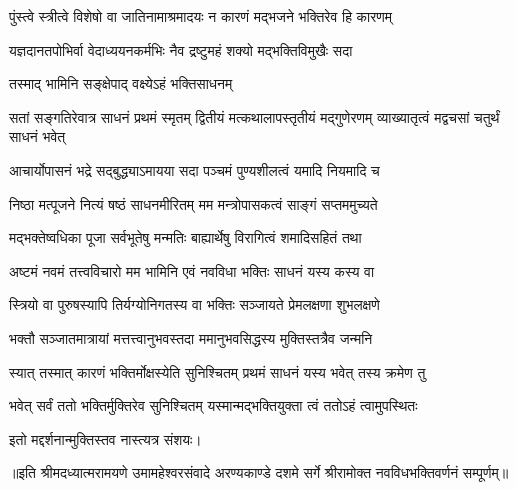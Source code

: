 


\addtocounter{shlokacount}{19}


\twolineshloka
{पुंस्त्वे स्त्रीत्वे विशेषो वा जातिनामाश्रमादयः}
{न कारणं मद्भजने भक्तिरेव हि कारणम्} %

\twolineshloka
{यज्ञदानतपोभिर्वा वेदाध्ययनकर्मभिः}
{नैव द्रष्टुमहं शक्यो मद्भक्तिविमुखैः सदा} %

\onelineshloka
{तस्माद् भामिनि सङ्क्षेपाद् वक्ष्येऽहं भक्तिसाधनम्} %


\threelineshloka
{सतां सङ्गतिरेवात्र साधनं प्रथमं स्मृतम्}
{द्वितीयं मत्कथालापस्तृतीयं मद्गुणेरणम्}
{व्याख्यातृत्वं मद्वचसां चतुर्थं साधनं भवेत्} %

\twolineshloka
{आचार्योपासनं भद्रे सद्बुद्ध्याऽमायया सदा}
{पञ्चमं पुण्यशीलत्वं यमादि नियमादि च} %

\twolineshloka
{निष्ठा मत्पूजने नित्यं षष्ठं साधनमीरितम्}
{मम मन्त्रोपासकत्वं साङ्गं सप्तममुच्यते} %

\twolineshloka
{मद्भक्तेष्वधिका पूजा सर्वभूतेषु मन्मतिः}
{बाह्यार्थेषु विरागित्वं शमादिसहितं तथा} %

\twolineshloka
{अष्टमं नवमं तत्त्वविचारो मम भामिनि}
{एवं नवविधा भक्तिः साधनं यस्य कस्य वा} %

\twolineshloka
{स्त्रियो वा पुरुषस्यापि तिर्यग्योनिगतस्य वा}
{भक्तिः सञ्जायते प्रेमलक्षणा शुभलक्षणे} %

\twolineshloka
{भक्तौ सञ्जातमात्रायां मत्तत्त्वानुभवस्तदा}
{ममानुभवसिद्धस्य मुक्तिस्तत्रैव जन्मनि} %

\twolineshloka
{स्यात् तस्मात् कारणं भक्तिर्मोक्षस्येति सुनिश्चितम्}
{प्रथमं साधनं यस्य भवेत् तस्य क्रमेण तु} %

\twolineshloka
{भवेत् सर्वं ततो भक्तिर्मुक्तिरेव सुनिश्चितम्}
{यस्मान्मद्भक्तियुक्ता त्वं ततोऽहं त्वामुपस्थितः} %


{इतो मद्दर्शनान्मुक्तिस्तव नास्त्यत्र संशयः।}

{॥इति श्रीमदध्यात्मरामयणे उमामहेश्वरसंवादे
अरण्यकाण्डे दशमे सर्गे श्रीरामोक्त  नवविधभक्तिवर्णनं  सम्पूर्णम्॥}
